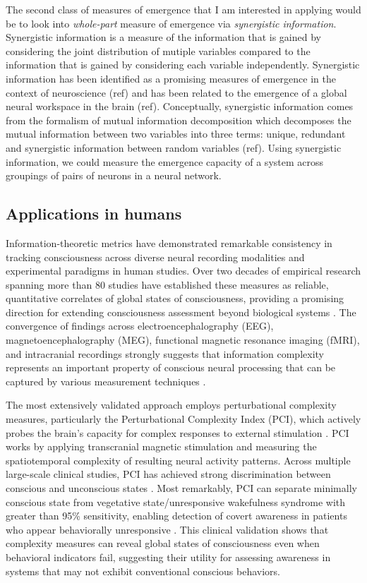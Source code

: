 \documentclass[11pt,a4paper]{article}
\begin{document}
The second class of measures of emergence that I am interested in applying would be to look into \textit{whole-part} measure of emergence via \textit{synergistic information}. Synergistic information is a measure of the information that is gained by considering the joint distribution of mutiple variables compared to the information that is gained by considering each variable independently. Synergistic information has been identified as a promising measures of emergence in the context of neuroscience (ref) and has been related to the emergence of a global neural workspace in the brain (ref). Conceptually, synergistic information comes from the formalism of mutual information decomposition which decomposes the mutual information between two variables into three terms: unique, redundant and synergistic information between random variables (ref). Using synergistic information, we could measure the emergence capacity of a system across groupings of pairs of neurons in a neural network.

\subsection{Applications in humans}

Information-theoretic metrics have demonstrated remarkable consistency in tracking consciousness across diverse neural recording modalities and experimental paradigms in human studies. Over two decades of empirical research spanning more than 80 studies have established these measures as reliable, quantitative correlates of global states of consciousness, providing a promising direction for extending consciousness assessment beyond biological systems \citep{Casali2013, Schartner2015, Sarasso2021}. The convergence of findings across electroencephalography (EEG), magnetoencephalography (MEG), functional magnetic resonance imaging (fMRI), and intracranial recordings strongly suggests that information complexity represents an important property of conscious neural processing that can be captured by various measurement techniques \citep{Zhang2001, Liu2019, Luppi2022}.

The most extensively validated approach employs perturbational complexity measures, particularly the Perturbational Complexity Index (PCI), which actively probes the brain's capacity for complex responses to external stimulation \citep{Casali2013, Casarotto2016}. PCI works by applying transcranial magnetic stimulation and measuring the spatiotemporal complexity of resulting neural activity patterns. Across multiple large-scale clinical studies, PCI has achieved strong discrimination between conscious and unconscious states \citep{Sarasso2015, Casarotto2016}. Most remarkably, PCI can separate minimally conscious state from vegetative state/unresponsive wakefulness syndrome with greater than 95\% sensitivity, enabling detection of covert awareness in patients who appear behaviorally unresponsive \citep{Casarotto2016}. This clinical validation shows that complexity measures can reveal global states of consciousness even when behavioral indicators fail, suggesting their utility for assessing awareness in systems that may not exhibit conventional conscious behaviors.
\end{document}
